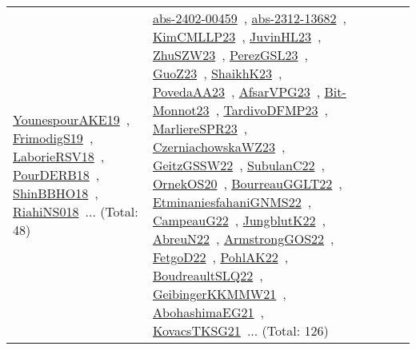 {\begin{longtable}{lp{3cm}>{\raggedright\arraybackslash}p{6cm}>{\raggedright\arraybackslash}p{6cm}>{\raggedright\arraybackslash}p{8cm}}
\href{../works/YounespourAKE19.pdf}{YounespourAKE19}~\cite{YounespourAKE19}, \href{../works/FrimodigS19.pdf}{FrimodigS19}~\cite{FrimodigS19}, \href{../works/LaborieRSV18.pdf}{LaborieRSV18}~\cite{LaborieRSV18}, \href{../works/PourDERB18.pdf}{PourDERB18}~\cite{PourDERB18}, \href{../works/ShinBBHO18.pdf}{ShinBBHO18}~\cite{ShinBBHO18}, \href{../works/RiahiNS018.pdf}{RiahiNS018}~\cite{RiahiNS018}... (Total: 48) & \href{../works/abs-2402-00459.pdf}{abs-2402-00459}~\cite{abs-2402-00459}, \href{../works/abs-2312-13682.pdf}{abs-2312-13682}~\cite{abs-2312-13682}, \href{../works/KimCMLLP23.pdf}{KimCMLLP23}~\cite{KimCMLLP23}, \href{../works/JuvinHL23.pdf}{JuvinHL23}~\cite{JuvinHL23}, \href{../works/ZhuSZW23.pdf}{ZhuSZW23}~\cite{ZhuSZW23}, \href{../works/PerezGSL23.pdf}{PerezGSL23}~\cite{PerezGSL23}, \href{../works/GuoZ23.pdf}{GuoZ23}~\cite{GuoZ23}, \href{../works/ShaikhK23.pdf}{ShaikhK23}~\cite{ShaikhK23}, \href{../works/PovedaAA23.pdf}{PovedaAA23}~\cite{PovedaAA23}, \href{../works/AfsarVPG23.pdf}{AfsarVPG23}~\cite{AfsarVPG23}, \href{../works/Bit-Monnot23.pdf}{Bit-Monnot23}~\cite{Bit-Monnot23}, \href{../works/TardivoDFMP23.pdf}{TardivoDFMP23}~\cite{TardivoDFMP23}, \href{../works/MarliereSPR23.pdf}{MarliereSPR23}~\cite{MarliereSPR23}, \href{../works/CzerniachowskaWZ23.pdf}{CzerniachowskaWZ23}~\cite{CzerniachowskaWZ23}, \href{../works/GeitzGSSW22.pdf}{GeitzGSSW22}~\cite{GeitzGSSW22}, \href{../works/SubulanC22.pdf}{SubulanC22}~\cite{SubulanC22}, \href{../works/OrnekOS20.pdf}{OrnekOS20}~\cite{OrnekOS20}, \href{../works/BourreauGGLT22.pdf}{BourreauGGLT22}~\cite{BourreauGGLT22}, \href{../works/EtminaniesfahaniGNMS22.pdf}{EtminaniesfahaniGNMS22}~\cite{EtminaniesfahaniGNMS22}, \href{../works/CampeauG22.pdf}{CampeauG22}~\cite{CampeauG22}, \href{../works/JungblutK22.pdf}{JungblutK22}~\cite{JungblutK22}, \href{../works/AbreuN22.pdf}{AbreuN22}~\cite{AbreuN22}, \href{../works/ArmstrongGOS22.pdf}{ArmstrongGOS22}~\cite{ArmstrongGOS22}, \href{../works/FetgoD22.pdf}{FetgoD22}~\cite{FetgoD22}, \href{../works/PohlAK22.pdf}{PohlAK22}~\cite{PohlAK22}, \href{../works/BoudreaultSLQ22.pdf}{BoudreaultSLQ22}~\cite{BoudreaultSLQ22}, \href{../works/GeibingerKKMMW21.pdf}{GeibingerKKMMW21}~\cite{GeibingerKKMMW21}, \href{../works/AbohashimaEG21.pdf}{AbohashimaEG21}~\cite{AbohashimaEG21}, \href{../works/KovacsTKSG21.pdf}{KovacsTKSG21}~\cite{KovacsTKSG21}... (Total: 126)\\

\end{longtable}}
